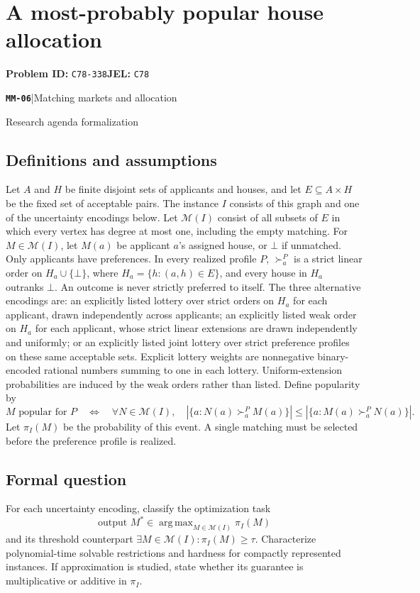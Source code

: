 \documentclass[11pt,a4paper]{article}
\DeclareMathOperator*{\argmax}{arg\,max}
\newcommand{\entrymeta}[3]{{\sffamily\small\color{muted}\textbf{\texttt{#1}}\quad|\quad #2\par #3\par}}
\begin{document}
\section*{A most-probably popular house allocation}
\textbf{Problem ID:} \texttt{C78-338}\quad \textbf{JEL:} \texttt{C78}\par
\label{problem:OP-0547}
\label{beyond:MM-06}
\entrymeta{MM-06}{Matching markets and allocation}{Research agenda formalization}
\subsection*{Definitions and assumptions}
Let $A$ and $H$ be finite disjoint sets of applicants and houses, and let $E\subseteq A\times H$ be the fixed set of acceptable pairs. The instance $I$ consists of this graph and one of the uncertainty encodings below. Let $\mathcal M(I)$ consist of all subsets of $E$ in which every vertex has degree at most one, including the empty matching. For $M\in\mathcal M(I)$, let $M(a)$ be applicant $a$'s assigned house, or $\bot$ if unmatched. Only applicants have preferences. In every realized profile $P$, $\succ_a^P$ is a strict linear order on $H_a\cup\{\bot\}$, where $H_a=\{h:(a,h)\in E\}$, and every house in $H_a$ outranks $\bot$. An outcome is never strictly preferred to itself. The three alternative encodings are: an explicitly listed lottery over strict orders on $H_a$ for each applicant, drawn independently across applicants; an explicitly listed weak order on $H_a$ for each applicant, whose strict linear extensions are drawn independently and uniformly; or an explicitly listed joint lottery over strict preference profiles on these same acceptable sets. Explicit lottery weights are nonnegative binary-encoded rational numbers summing to one in each lottery. Uniform-extension probabilities are induced by the weak orders rather than listed. Define popularity by
\[
 M\text{ popular for }P
 \quad\Longleftrightarrow\quad
 \forall N\in\mathcal M(I),\quad
 |\{a:N(a)\succ_a^P M(a)\}|
 \le |\{a:M(a)\succ_a^P N(a)\}|.
\]
Let $\pi_I(M)$ be the probability of this event. A single matching must be selected before the preference profile is realized.
\subsection*{Formal question}
For each uncertainty encoding, classify the optimization task
\[
 \text{output }M^*\in\argmax_{M\in\mathcal M(I)}\pi_I(M)
\]
and its threshold counterpart $\exists M\in\mathcal M(I):\pi_I(M)\ge\tau$. Characterize polynomial-time solvable restrictions and hardness for compactly represented instances. If approximation is studied, state whether its guarantee is multiplicative or additive in $\pi_I$.
\end{document}
